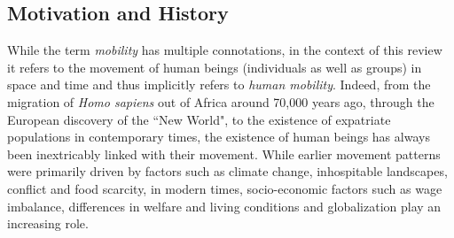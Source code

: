 \subsection{Motivation and History}
While the term \emph{mobility} has multiple connotations, in the context of this review it refers to the movement of human beings (individuals as well as groups) in space and time and thus implicitly refers to \emph{human mobility}. Indeed, from the migration of {\it Homo sapiens} out of Africa around 70,000 years ago, through the European discovery of the ``New World", to the existence of expatriate populations in contemporary times, the existence of human beings has always been inextricably linked with their movement. While earlier movement patterns were primarily driven by factors such as climate change, inhospitable landscapes, conflict and food scarcity, in modern times, socio-economic factors such as wage imbalance, differences in welfare and living conditions and globalization play an increasing role. 

